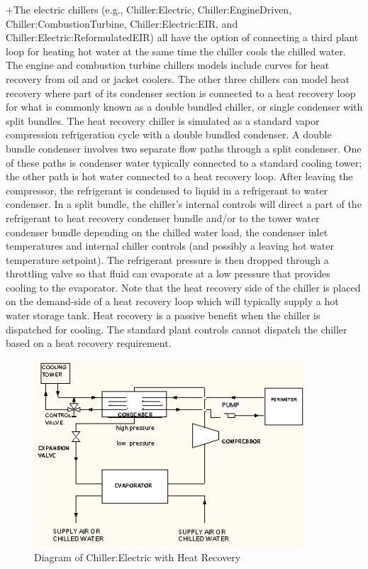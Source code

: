 +The electric chillers (e.g., Chiller:Electric, Chiller:EngineDriven, Chiller:CombustionTurbine, Chiller:Electric:EIR, and Chiller:Electric:ReformulatedEIR) all have the option of connecting a third plant loop for heating hot water at the same time the chiller cools the chilled water. The engine and combustion turbine chillers models include curves for heat recovery from oil and or jacket coolers. The other three chillers can model heat recovery where part of its condenser section is connected to a heat recovery loop for what is commonly known as a double bundled chiller, or single condenser with split bundles. The heat recovery chiller is simulated as a standard vapor compression refrigeration cycle with a double bundled condenser. A double bundle condenser involves two separate flow paths through a split condenser. One of these paths is condenser water typically connected to a standard cooling tower; the other path is hot water connected to a heat recovery loop. After leaving the compressor, the refrigerant is condensed to liquid in a refrigerant to water condenser. In a split bundle, the chiller's internal controls will direct a part of the refrigerant to heat recovery condenser bundle and/or to the tower water condenser bundle depending on the chilled water load, the condenser inlet temperatures and internal chiller controls (and possibly a leaving hot water temperature setpoint). The refrigerant pressure is then dropped through a throttling valve so that fluid can evaporate at a low pressure that provides cooling to the evaporator. Note that the heat recovery side of the chiller is placed on the demand-side of a heat recovery loop which will typically supply a hot water storage tank. Heat recovery is a passive benefit when the chiller is dispatched for cooling. The standard plant controls cannot dispatch the chiller based on a heat recovery requirement.

\begin{figure}[hbtp] %
\centering
\includegraphics[width=0.9\textwidth, height=0.9\textheight, keepaspectratio=true]{media/image3175.png}
\caption{Diagram of Chiller:Electric with Heat Recovery \protect \label{fig:diagram-of-chiller-electric-with-heat}}
\end{figure}

